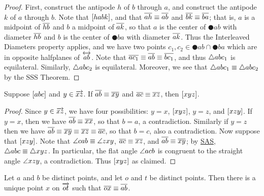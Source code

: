 \begin{proof}
First, construct the antipode \(h\) of \(b\) through \(a\), and construct the antipode \(k\) of \(a\) through \(b\).
Note that \([ habk ]\), and that \(\overline{ah} \equiv \overline{ab}\) and \(\overline{bk} \equiv \overline{ba}\); that is, \(a\) is a midpoint of \(\overline{hb}\) and \(b\) a midpoint of \(\overline{ak}\), so that \(a\) is the center of \(\CIRCLE{a}{b}\) with diameter \(\overline{hb}\) and \(b\) is the center of \(\CIRCLE{b}{a}\) with diameter \(\overline{ak}\).
Thus the Interleaved Diameters property applies, and we have two points \(c_1,c_2 \in \CIRCLE{a}{b} \cap \CIRCLE{b}{a}\) which are in opposite halfplanes of \(\overleftrightarrow{ab}\).
Note that \(\overline{ac_1} \equiv \overline{ab} \equiv \overline{bc_1}\), and thus \(\bigtriangleup{abc_1}\) is equilateral.
Similarly, \(\bigtriangleup{abc_2}\) is equilateral.
Moreover, we see that \(\bigtriangleup{abc_1} \equiv \bigtriangleup{abc_2}\) by the SSS Theorem.
\end{proof}

\begin{lem}\label{lem:betweenness-transfer}
Suppose \([ a b c ]\) and \(y \in \overrightarrow{xz}\).
If \(\overline{ab} \equiv \overline{xy}\) and \(\overline{ac} \equiv \overline{xz}\), then \([ x y z ]\).
\end{lem}

\begin{proof}
Since \(y \in \overrightarrow{xz}\), we have four possibilities: \(y = x\), \([ x y z ]\), \(y = z\), and \([ x z y ]\).
If \(y = x\), then we have \(\overline{ab} \equiv \overline{xx}\), so that \(b = a\), a contradiction.
Similarly if \(y = z\) then we have \(\overline{ab} \equiv \overline{xy} \equiv \overline{xz} \equiv \overline{ac}\), so that \(b = c\), also a contradiction.
Now suppose that \([ x z y ]\).
Note that \(\angle{cab} \equiv \angle{zxy}\), \(\overline{ac} \equiv \overline{xz}\), and \(\overline{ab} \equiv \overline{xy}\); by \hyperref[prop:sas-theorem]{SAS}, \(\bigtriangleup{abc} \equiv \bigtriangleup{xyz}\).
In particular, the flat angle \(\angle{acb}\) is congruent to the straight angle \(\angle{xzy}\), a contradiction.
Thus \([ x y z ]\) as claimed.
\end{proof}

\begin{construct}
Let \(a\) and \(b\) be distinct points, and let \(o\) and \(t\) be distinct points.
Then there is a unique point \(x\) on \(\overrightarrow{ot}\) such that \(\overline{ox} \equiv \overline{ab}\).
\end{construct}


